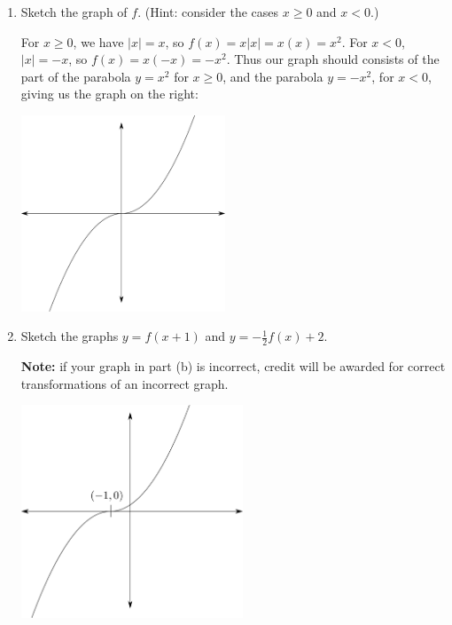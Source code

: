 \documentclass[12pt]{article}
\newcommand{\points}[1]{\marginpar{\hspace{24pt}[#1]}}
\newcommand{\abs}[1]{\lvert #1\rvert}
\begin{document}
\begin{enumerate}
\begin{enumerate}
 \item Sketch the graph of $f$. (Hint: consider the cases $x\geq 0$ and $x<0$.) \points{3}
\begin{multicols}{2}
 For $x\geq 0$, we have $\abs{x}=x$, so $f(x)=x\abs{x} = x(x)=x^2$. For $x<0$, $\abs{x}=-x$, so $f(x) = x(-x)=-x^2$. Thus our graph should consists of the part of the parabola $y=x^2$ for $x\geq 0$, and the parabola $y=-x^2$, for $x<0$, giving us the graph on the right:
\columnbreak
\begin{center}
 \includegraphics[height=2.3in]{Plot4(b)A.pdf}
\end{center}

\end{multicols}


 \item Sketch the graphs $y=f(x+1)$ and $y=-\frac{1}{2}f(x)+2$. \points{4}

{\bf Note:} if your graph in part (b) is incorrect, credit will be awarded for correct transformations of an incorrect graph.

\begin{multicols}{2}
 \begin{center}
 \includegraphics[height=2.5in]{Plot4(c)1A.pdf}


\end{center}
\end{multicols}
\end{enumerate}
\end{enumerate}
\end{document}
